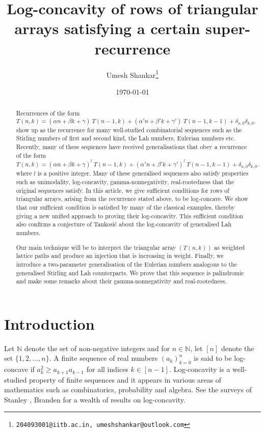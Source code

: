 \documentclass{article}
\title{Log-concavity of rows of triangular arrays satisfying a certain super-recurrence}
\author[1]{Umesh Shankar\thanks{\tt{204093001@iitb.ac.in, umeshshankar@outlook.com}}}
\affil[1]{Department of Mathematics, Indian Institute of Technology Bombay, Mumbai 400076, India}
\date{\today}
\newcommand{\SSS}{\mathfrak{S}}
\newcommand{\N}{\mathbb{N}}
\theoremstyle{definition}
\numberwithin{equation}{section}
\begin{document}
\maketitle
\begin{abstract}
Recurrences of the form 
\begin{equation*}
    T(n,k) = (\alpha n+\beta k +\gamma) \ T(n-1,k) + (\alpha'n+\beta'k+\gamma')\ T(n-1,k-1)+\delta_{n,0}\delta_{k,0}.
\end{equation*}
show up as the recurrence for many well-studied combinatorial sequences such as the Stirling numbers of first and second kind, the Lah numbers, Eulerian numbers etc. Recently, many of these sequences have received generalisations that obey a recurrence of the form
\begin{equation*}
    T(n,k) = (\alpha n+\beta k +\gamma)^l \ T(n-1,k) + (\alpha'n+\beta'k+\gamma')^l\ T(n-1,k-1)+\delta_{n,0}\delta_{k,0}.
\end{equation*}
where $l$ is a positive integer. Many of these generalised sequences also satisfy properties such as unimodality, log-concavity, gamma-nonnegativity, real-rootedness that the original sequences satisfy. In this article, we give sufficient conditions for rows of triangular arrays, arising from the recurrence stated above, to be log-concave. We show that our sufficient condition is satisfied by many of the classical examples, thereby giving a new unified approach to proving their log-concavity. This sufficient condition also confirms a conjecture of Tankosi{\v c} \cite{aleks-gen-lah} about the log-concavity of generalised Lah numbers. 

Our main technique will be to interpret the triangular array $(T(n,k))$ as weighted lattice paths and produce an injection that is increasing in weight.
Finally, we introduce a two-parameter generalisation of the Eulerian numbers analogous to the generalised Stirling and Lah counterparts. We prove that this sequence is palindromic and make some remarks about their gamma-nonnegativity and real-rootedness.
\end{abstract}
\section{Introduction}
Let $\N$ denote the set of non-negative integers and for $n \in \N$, let $[n]$ denote the set $\{ 1,2,\dotsc, n\}$. A finite sequence of real numbers $(a_k)_{k=0}^n$ is said to be log-concave if $a_{k}^2\ge a_{k+1}a_{k-1}$ for all indices $k\in [n-1]$. Log-concavity is a well-studied property of finite sequences and it appears in various areas of mathematics such as combinatorics, probability and algebra. See the surveys of Stanley \cite{stanley-survey-logcon}, Branden \cite{branden-unimodality_log_concavity} for a wealth of results on log-concavity.
\end{document}
